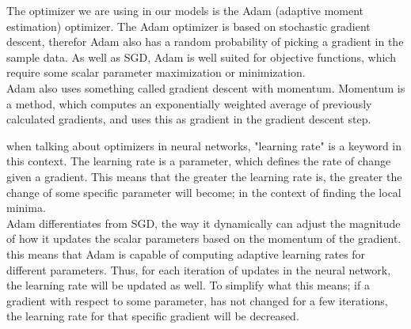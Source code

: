 The optimizer we are using in our models is the Adam (adaptive moment estimation) optimizer. The Adam optimizer is based on stochastic gradient descent\cite{adam}, therefor Adam also has a random probability of picking a gradient in the sample data. As well as SGD, Adam is well suited for objective functions, which require some scalar parameter maximization or minimization. \\

\noindent
Adam also uses something called gradient descent with momentum. Momentum is a method, which computes an exponentially weighted average of previously calculated gradients, and uses this as gradient in the gradient descent step.

\noindent
when talking about optimizers in neural networks, "learning rate" is a keyword in this context. The learning rate is a parameter, which defines the rate of change given a gradient. This means that the greater the learning rate is, the greater the change of some specific parameter will become; in the context of finding the local minima.\\

\noindent
Adam differentiates from SGD, the way it dynamically can adjust the magnitude of how it updates the scalar parameters based on the momentum of the gradient. this means that Adam is capable of computing adaptive learning rates for different parameters\cite{adam}. Thus, for each iteration of updates in the neural network, the learning rate will be updated as well. To simplify what this means; if a gradient with respect to some parameter, has not changed for a few iterations, the learning rate for that specific gradient will be decreased.